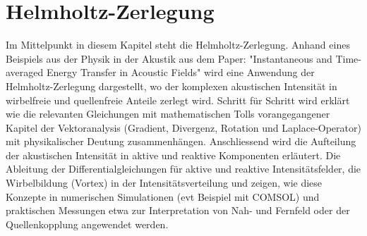 %
%
%
%
\chapter{Helmholtz-Zerlegung\label{chapter:helmholtz}}
\begin{refsection}

Im Mittelpunkt in diesem Kapitel steht die Helmholtz-Zerlegung. Anhand eines Beispiels aus der Physik in der Akustik aus dem Paper: "Instantaneous and Time-averaged Energy Transfer in Acoustic Fields" wird eine Anwendung der Helmholtz-Zerlegung dargestellt, wo der komplexen akustischen Intensität in wirbelfreie und quellenfreie Anteile zerlegt wird. Schritt für Schritt wird erklärt wie die relevanten Gleichungen mit mathematischen Tolls vorangegangener Kapitel der Vektoranalysis (Gradient, Divergenz, Rotation und Laplace-Operator) mit physikalischer Deutung zusammenhängen. Anschliessend wird die Aufteilung der akustischen Intensität in aktive und reaktive Komponenten erläutert. Die Ableitung der Differentialgleichungen für aktive und reaktive Intensitätsfelder, die Wirbelbildung (Vortex) in der Intensitätsverteilung und zeigen, wie diese Konzepte in numerischen Simulationen (evt Beispiel mit COMSOL) und praktischen Messungen etwa zur Interpretation von Nah- und Fernfeld oder der Quellenkopplung angewendet werden.








\printbibliography[heading=subbibliography]
\end{refsection}
